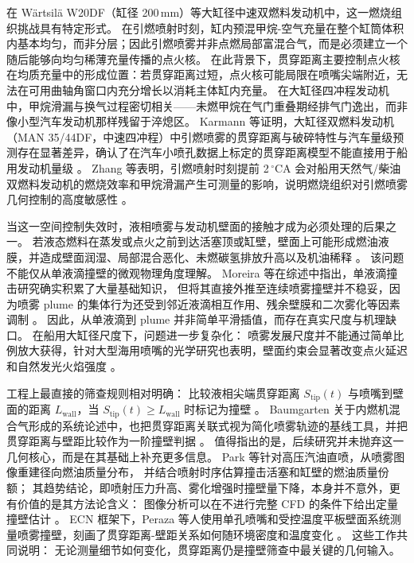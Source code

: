 在 Wärtsilä W20DF（缸径 200\,mm）等大缸径中速双燃料发动机中，这一燃烧组织挑战具有特定形式。
在引燃喷射时刻，缸内预混甲烷-空气充量在整个缸筒体积内基本均匀，而非分层；因此引燃喷雾并非点燃局部富混合气，而是必须建立一个随后能够向均匀稀薄充量传播的点火核。
在此背景下，贯穿距离主要控制点火核在均质充量中的形成位置：若贯穿距离过短，点火核可能局限在喷嘴尖端附近，无法在可用曲轴角窗口内充分增长以消耗主体缸内充量。
在大缸径四冲程发动机中，甲烷滑漏与换气过程密切相关——未燃甲烷在气门重叠期经排气门逸出，而非像小型汽车发动机那样残留于淬熄区。
Karmann 等证明，大缸径双燃料发动机（MAN 35/44DF，中速四冲程）中引燃喷雾的贯穿距离与破碎特性与汽车量级预测存在显著差异，确认了在汽车小喷孔数据上标定的贯穿距离模型不能直接用于船用发动机量级 \cite{KarmannDualFuelOptical2023}。
Zhang 等表明，引燃喷射时刻提前 2\,$^{\circ}$CA 会对船用天然气/柴油双燃料发动机的燃烧效率和甲烷滑漏产生可测量的影响，说明燃烧组织对引燃喷雾几何控制的高度敏感性 \cite{ZhangPilotTiming2024}。

当这一空间控制失效时，液相喷雾与发动机壁面的接触才成为必须处理的后果之一。
若液态燃料在蒸发或点火之前到达活塞顶或缸壁，壁面上可能形成燃油液膜，并造成壁面润湿、局部混合恶化、未燃碳氢排放升高以及机油稀释
\cite{peraza2022swi,ahmad2025fueldilution,MorieiraMotaPanao2010}。
该问题不能仅从单液滴撞壁的微观物理角度理解。
Moreira 等在综述中指出，单液滴撞击研究确实积累了大量基础知识，
但将其直接外推至连续喷雾撞壁并不稳妥，因为喷雾 plume 的集体行为还受到邻近液滴相互作用、残余壁膜和二次雾化等因素调制
\cite{MorieiraMotaPanao2010}。
因此，从单液滴到 plume 并非简单平滑插值，而存在真实尺度与机理缺口。
在船用大缸径尺度下，问题进一步复杂化：
喷雾发展尺度并不能通过简单比例放大获得，针对大型海用喷嘴的光学研究也表明，壁面约束会显著改变点火延迟和自然发光火焰强度
\cite{liu2024marine_impingement}。

工程上最直接的筛查规则相对明确：
比较液相尖端贯穿距离 $S_\mathrm{tip}(t)$ 与喷嘴到壁面的距离 $L_\mathrm{wall}$，当 \(S_\mathrm{tip}(t) \geq L_\mathrm{wall}\) 时标记为撞壁
\cite{Baumgarten2006MixFormation}。
Baumgarten 关于内燃机混合气形成的系统论述中，也把贯穿距离关联式视为简化喷雾轨迹的基线工具，并把贯穿距离与壁距比较作为一阶撞壁判据
\cite{Baumgarten2006MixFormation}。
值得指出的是，后续研究并未抛弃这一几何核心，而是在其基础上补充更多信息。
Park 等针对高压汽油直喷，从喷雾图像重建径向燃油质量分布，
并结合喷射时序估算撞击活塞和缸壁的燃油质量份额；
其趋势结论，即喷射压力升高、雾化增强时撞壁量下降，本身并不意外，更有价值的是其方法论含义：
图像分析可以在不进行完整 CFD 的条件下给出定量撞壁估计
\cite{Park2018WallImpingement}。
ECN 框架下，Peraza 等人使用单孔喷嘴和受控温度平板壁面系统测量喷雾撞壁，刻画了贯穿距离-壁距关系如何随环境密度和温度变化
\cite{peraza2022swi}。
这些工作共同说明：
无论测量细节如何变化，贯穿距离仍是撞壁筛查中最关键的几何输入。

